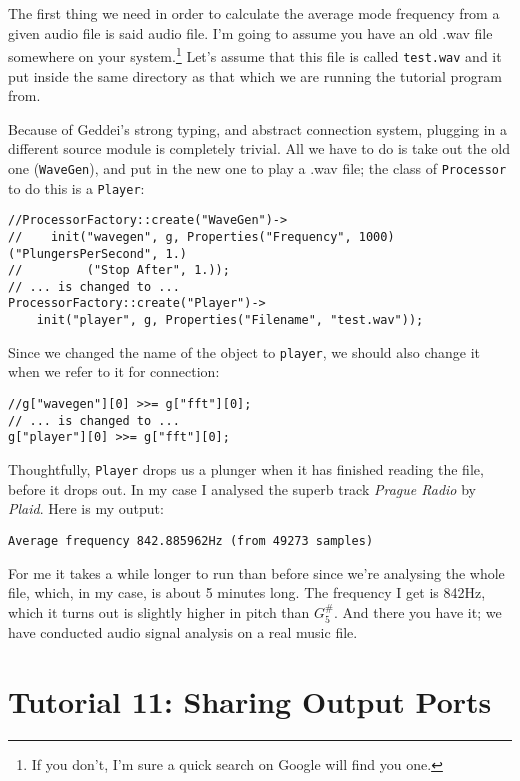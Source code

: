 The first thing we need in order to calculate the average mode frequency from a given audio file is said audio file. I'm going to assume you have an old .wav file somewhere on your system.\footnote{If you don't, I'm sure a quick search on Google will find you one.} Let's assume that this file is called \texttt{test.wav} and it put inside the same directory as that which we are running the tutorial program from.

Because of Geddei's strong typing, and abstract connection system, plugging in a different source module is completely trivial. All we have to do is take out the old one (\texttt{WaveGen}), and put in the new one to play a .wav file; the class of \texttt{Processor} to do this is a \texttt{Player}:

\begin{verbatim}
//ProcessorFactory::create("WaveGen")->
//    init("wavegen", g, Properties("Frequency", 1000)("PlungersPerSecond", 1.)
//         ("Stop After", 1.));
// ... is changed to ...
ProcessorFactory::create("Player")->
    init("player", g, Properties("Filename", "test.wav"));
\end{verbatim}

Since we changed the name of the object to \texttt{player}, we should also change it when we refer to it for connection:

\begin{verbatim}
//g["wavegen"][0] >>= g["fft"][0];
// ... is changed to ...
g["player"][0] >>= g["fft"][0];
\end{verbatim}

Thoughtfully, \texttt{Player} drops us a plunger when it has finished reading the file, before it drops out. In my case I analysed the superb track \textit{Prague Radio} by \textit{Plaid}. Here is my output:

\begin{verbatim}
Average frequency 842.885962Hz (from 49273 samples)
\end{verbatim}

For me it takes a while longer to run than before since we're analysing the whole file, which, in my case, is about 5 minutes long. The frequency I get is 842Hz, which it turns out is slightly higher in pitch than $G^\#_5$. And there you have it; we have conducted audio signal analysis on a real music file.




\section{Tutorial 11: Sharing Output Ports}

